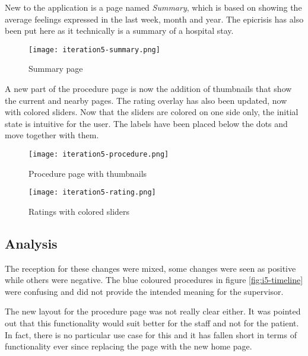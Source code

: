 New to the application is a page named \emph{Summary}, which is based on showing the average feelings expressed in the last week, month and year. The epicrisis has also been put here as it technically is a summary of a hospital stay.

\begin{figure}
    \centering
    \texttt{[image: iteration5-summary.png]}
    \caption{Summary page}
    \label{fig:i5-summary}
\end{figure}

A new part of the procedure page is now the addition of thumbnails that show the current and nearby pages. The rating overlay has also been updated, now with colored sliders. Now that the sliders are colored on one side only, the initial state is intuitive for the user. The labels have been placed below the dots and move together with them.

\begin{figure}
    \centering
    \begin{minipage}{0.45\textwidth}
        \centering
        \texttt{[image: iteration5-procedure.png]}
        \caption{Procedure page with thumbnails}
        \label{fig:i5-procedure}
    \end{minipage}
    \begin{minipage}{0.45\textwidth}
        \centering
        \texttt{[image: iteration5-rating.png]}
        \caption{Ratings with colored sliders}
        \label{fig:i5-rating}
    \end{minipage}
\end{figure}

\subsection{Analysis}

The reception for these changes were mixed, some changes were seen as positive while others were negative. The blue coloured procedures in figure \ref{fig:i5-timeline} were confusing and did not provide the intended meaning for the supervisor.

The new layout for the procedure page was not really clear either. It was pointed out that this functionality would suit better for the staff and not for the patient. In fact, there is no particular use case for this and it has fallen short in terms of functionality ever since replacing the page with the new home page.

